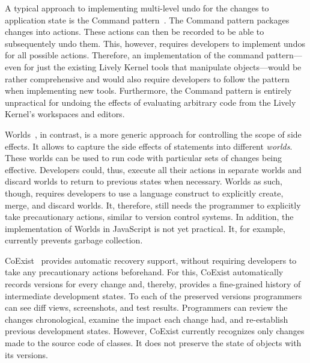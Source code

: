 A typical approach to implementing multi-level undo for the changes to application state is the Command pattern~\cite{GammaHelmJohnsonVlissides95}.
The Command pattern packages changes into actions.
These actions can then be recorded to be able to subsequentely undo them.
This, however, requires developers to implement undos for all possible actions.
Therefore, an implementation of the command pattern---even for just the existing Lively Kernel tools that manipulate objects---would be rather comprehensive and would also require developers to follow the pattern when implementing new tools.
Furthermore, the Command pattern is entirely unpractical for undoing the effects of evaluating arbitrary code from the Lively Kernel's workspaces and editors.

Worlds~\cite{Warth2011Wor}, in contrast, is a more generic approach for controlling the scope of side effects.
It allows to capture the side effects of statements into different \emph{worlds}.
These worlds can be used to run code with particular sets of changes being effective.
Developers could, thus, execute all their actions in separate worlds and discard worlds to return to previous states when necessary.
Worlds as such, though, requires developers to use a language construct to explicitly create, merge, and discard worlds.
It, therefore, still needs the programmer to explicitly take precautionary actions, similar to version control systems.
In addition, the implementation of Worlds in JavaScript is not yet practical.
It, for example, currently prevents garbage collection.

CoExist~\cite{Steinert2012COE,Steinert2014EVA} provides automatic recovery support, without requiring developers to take any precautionary actions beforehand.
For this, CoExist automatically records versions for every change and, thereby, provides a fine-grained history of intermediate development states.
To each of the preserved versions programmers can see diff views, screenshots, and test results.
Programmers can review the changes chronological, examine the impact each change had, and re-establish previous development states.
However, CoExist currently recognizes only changes made to the source code of classes.
It does not preserve the state of objects with its versions.

